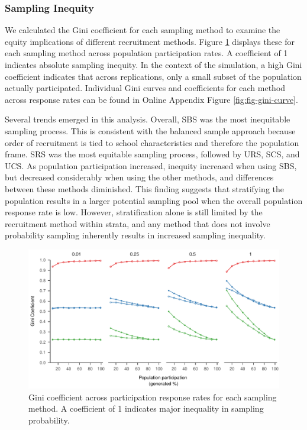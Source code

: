 \documentclass[
  english,
  man,floatsintext]{apa6}
\begin{document}
\hypertarget{sampling-inequity-1}{%
\subsubsection{Sampling Inequity}\label{sampling-inequity-1}}

We calculated the Gini coefficient for each sampling method to examine the equity implications of different recruitment methods. Figure \ref{fig:fig-gini} displays these for each sampling method across population participation rates. A coefficient of 1 indicates absolute sampling inequity. In the context of the simulation, a high Gini coefficient indicates that across replications, only a small subset of the population actually participated.   
Individual Gini curves and coefficients for each method across response rates can be found in Online Appendix Figure \ref{fig:fig-gini-curve}.

Several trends emerged in this analysis. Overall, SBS was the most inequitable sampling process. This is consistent with the balanced sample approach because order of recruitment is tied to school characteristics and therefore the population frame. SRS was the most equitable sampling process, followed by URS, SCS, and UCS.
As population participation increased, inequity increased when using SBS, but decreased considerably when using the other methods, and differences between these methods diminished. This finding suggests that stratifying the population results in a larger potential sampling pool when the overall population response rate is low.
However, stratification alone is still limited by the recruitment method within strata, and any method that does not involve probability sampling inherently results in increased sampling inequality.



\begin{figure}
\centering
\includegraphics{6---Paper_files/figure-latex/fig-gini-1.pdf}
\caption{\label{fig:fig-gini}Gini coefficient across participation response rates for each sampling method. A coefficient of 1 indicates major inequality in sampling probability.}
\end{figure}
\end{document}

